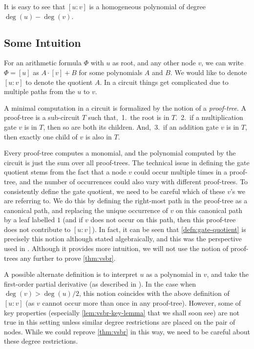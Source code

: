 \noindent
It is easy to see that $[u:v]$ is a homogeneous polynomial of degree
$\deg(u) - \deg(v)$. 

\subsection*{Some Intuition}

For an arithmetic formula $\Phi$ with $u$ as root, and any other node
$v$, we can write $\Phi = [u]$ as $A \cdot [v] + B$ for some
polynomials $A$ and $B$. 
We would like to denote $[u:v]$ to denote the
quotient $A$. 
In a circuit things get complicated due to multiple
paths from the $u$ to $v$.

A minimal computation in a circuit is formalized by the notion of a \emph{proof-tree}. 
A proof-tree is a sub-circuit $T$ such that,
\,1.\ the root is in $T$.
\,2.\ if a multiplication gate $v$ is in $T$, then so are both its children.
And,
\,3.\ if an addition gate $v$ is in $T$, then exactly one child of $v$ is also in $T$.

Every proof-tree computes a monomial, and the polynomial computed by
the circuit is just the sum over all proof-trees. 
The technical issue
in defining the gate quotient stems from the fact that a node $v$
could occur multiple times in a proof-tree, and the number of
occurrences could also vary with different proof-trees. 
To
consistently define the gate quotient, we need to be careful which of
these $v$'s we are referring to. 
We do this by defining the right-most
path in the proof-tree as a canonical path, and replacing the unique
occurrence of $v$ on this canonical path by a leaf labelled $1$ (and
if $v$ does not occur on this path, then this proof-tree does not
contribute to $[u:v]$). 
In fact, it can be seen that
\autoref{defn:gate-quotient} is precisely this notion although
stated algebraically, and this was the perspective used in
\cite{ajmv98}. 
Although it provides more intuition, we
will not use the notion of proof-trees any further to prove
\autoref{thm:vsbr}.

A possible alternate definition is to interpret $u$ as a polynomial in
$v$, and take the first-order partial derivative (as described in
\cite{sy}). 
In the case when $\deg(v) > \deg(u)/2$, this notion
coincides with the above definition of $[u:v]$ (as $v$ cannot occur
more than once in any proof-tree). 
However, some of key properties
(especially \autoref{lem:vsbr-key-lemma} that we shall soon see) are
not true in this setting unless similar degree restrictions are placed
on the pair of nodes. 
While we could reprove \autoref{thm:vsbr} in
this way, we need to be careful about these degree restrictions.

